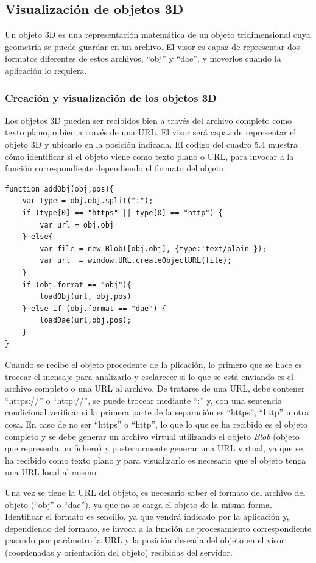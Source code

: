 \subsection{Visualización de objetos 3D}
Un objeto 3D es una representación matemática de un objeto tridimensional cuya geometría se puede guardar en un archivo. El visor es capaz de representar dos formatos diferentes de estos archivos, ``obj'' y ``dae'', y moverlos cuando la aplicación lo requiera. 

\subsubsection{Creación y visualización de los objetos 3D}
Los objetos 3D pueden ser recibidos bien a través del archivo completo como texto plano, o bien a través de una URL. El visor será capaz de representar el objeto 3D y ubicarlo en la posición indicada. El código del cuadro 5.4 muestra cómo identificar si el objeto viene como texto plano o URL, para invocar a la función correspondiente dependiendo el formato del objeto.


\begin{lstlisting}[caption= Creación y visualización de objetos 3D, label=cod.crearobjetos3d]
function addObj(obj,pos){
	var type = obj.obj.split(":");
	if (type[0] == "https" || type[0] == "http") {
		var url = obj.obj
	} else{
		var file = new Blob([obj.obj], {type:'text/plain'});
		var url  = window.URL.createObjectURL(file);
	}
	if (obj.format == "obj"){
		loadObj(url, obj,pos)
	} else if (obj.format == "dae") {
		loadDae(url,obj.pos);
	}
}
\end{lstlisting}
Cuando se recibe el objeto procedente de la plicación, lo primero que se hace es trocear el mensaje para analizarlo y esclarecer si lo que se está enviando es el archivo completo o una URL al archivo. De tratarse de una URL, debe contener ``https://'' o ``http://'', se puede trocear mediante ``:'' y, con una sentencia condicional verificar si la primera parte de la separación es ``https'', ``http'' u otra cosa. En caso de no ser ``https'' o ``http'', lo que lo que se ha recibido es el objeto completo y se debe generar un archivo virtual utilizando el objeto \textit{Blob} (objeto que representa un fichero) y posteriormente generar una URL virtual, ya que se ha recibido como texto plano y para visualizarlo es necesario que el objeto tenga una URL local al mismo. 

Una vez se tiene la URL del objeto, es necesario saber el formato del archivo del objeto (``obj'' o ``dae''), ya que no se carga el objeto de la misma forma. Identificar el formato es sencillo, ya que vendrá indicado por la aplicación y, dependiendo del formato, se invoca a la función de procesamiento correspondiente pasando por parámetro la URL y la posición deseada del objeto en el visor (coordenadas y orientación del objeto) recibidas del servidor.

